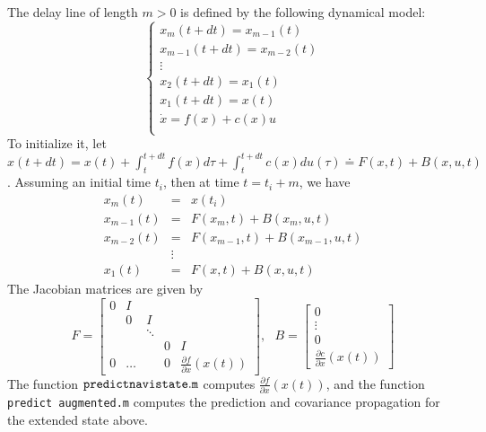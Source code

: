 \documentclass[]{article}
\newcommand{\ba}{\left[ \begin{array}}
\newcommand{\ea}{\end{array} \right]}
\newcommand{\bc}{\begin{cases}}
\newcommand{\ec}{\end{cases}}
\begin{document}
The delay line of length $m>0$ is defined by the following dynamical model:
\begin{equation}
\bc
x_m(t+dt) = x_{m-1}(t) \\
x_{m-1}(t+dt) = x_{m-2}(t) \\
\vdots \\
x_2(t+dt) = x_1(t) \\
x_1(t+dt) = x(t) \\
\dot x = f(x) + c(x) u \\
\ec
\end{equation} 
To initialize it, let $x(t+dt) = x(t) + \int_{t}^{t+dt} f(x)d\tau + \int_{t}^{t+dt} c(x)du(\tau) \doteq F(x, t) + B(x,u, t)$. Assuming an initial time $t_i$, then at time $t = t_i + m$, we have
\begin{eqnarray}
x_m(t) &=& x(t_i) \\
x_{m-1}(t) &=& F(x_m, t) + B(x_m, u, t)  \\ 
x_{m-2}(t) &=& F(x_{m-1}, t) + B(x_{m-1}, u, t) \\
& \vdots & \\
x_{1}(t) &=& F(x,t) + B(x,u,t) 
\end{eqnarray}
The Jacobian matrices are given by 
\begin{equation}
F = \ba{ccccc}
0 & I & & & \\
  & 0 & I & &  \\
  &   &   \ddots  & &   \\
  &   &           & 0 & I \\
0 &   \dots &           & 0  & \frac{\partial f}{\partial x}(x(t))
\ea, ~~~
B = \ba{c}
0 \\ \vdots \\ 0 \\ \frac{\partial c}{\partial x}(x(t))
\ea
\end{equation}
The function ${\tt predict navistate.m}$ computes $\frac{\partial f}{\partial x}(x(t))$, and the function {\tt predict augmented.m} computes the prediction and covariance propagation for the extended state above.
\end{document}
